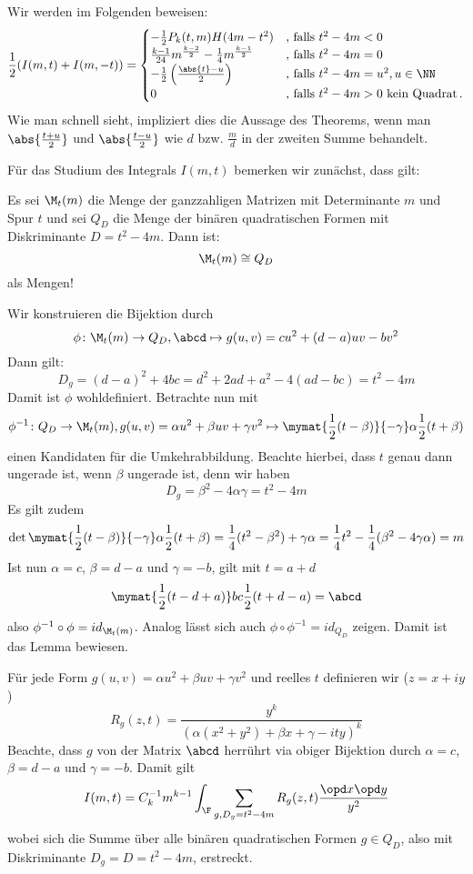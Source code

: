 \begin{bewe}
Wir werden im Folgenden beweisen:
\[
	\frac 12 (I(m,t) + I(m, -t)) = \begin{cases}
		- \frac 12 P_k(t,m) H(4m - t^2) &\text{, falls } t^2 - 4m < 0 \\
	\frac{k-1}{24} m^{\frac {k-2}2} - \frac 14 m^{\frac {k-1}2} &\text{, falls } t^2 - 4m = 0 \\
	- \frac 12 \left( \frac{\abs{t} - u}2 \right)&\text{, falls } t^2 - 4m = u^2, u \in \NN \\
	0 &\text{, falls } t^2 - 4m > 0 \text{ kein Quadrat} \,.
\end{cases}
\]
Wie man schnell sieht, impliziert dies die Aussage des Theorems, wenn man $\abs {\frac {t+u}2}$ und $\abs {\frac {t-u}2}$ wie $d$ bzw. $\frac md$ in der zweiten Summe behandelt.

Für das Studium des Integrals $I(m,t)$ bemerken wir zunächst, dass gilt:

\begin{lemm}
Es sei $\M_t(m)$ die Menge der ganzzahligen Matrizen mit Determinante $m$ und Spur $t$ und sei $Q_D$ die Menge der binären quadratischen Formen mit Diskriminante $D = t^2 - 4m$. Dann ist:
\[
	\M_t (m) \cong Q_D
\]
als Mengen!
\end{lemm}

\begin{bewe}
Wir konstruieren die Bijektion durch
\[
	\phi \colon \M_t (m) \to Q_D, \abcd \mapsto g(u, v) = cu^2 + (d-a)uv - bv^2
\]
Dann gilt:
\[
	D_g = (d-a)^2 + 4bc = d^2 + 2ad + a^2 - 4(ad-bc) = t^2 - 4m
\]
Damit ist $\phi$ wohldefiniert. Betrachte nun mit
\[
	\phi^{-1} \colon Q_D \to \M_t (m), g(u, v) = \alpha u^2 + \beta uv + \gamma v^2 \mapsto \mymat {\frac 12 (t - \beta)} {-\gamma} \alpha {\frac 12(t + \beta)}
\]
einen Kandidaten für die Umkehrabbildung. Beachte hierbei, dass $t$ genau dann ungerade ist, wenn $\beta$ ungerade ist, denn wir haben
\[
	D_g = \beta^2 - 4\alpha \gamma = t^2 - 4m
\]
Es gilt zudem
\[
	\det \mymat {\frac 12 (t - \beta)} {-\gamma} \alpha {\frac 12(t + \beta)} = \frac 14 (t^2 - \beta^2) + \gamma \alpha = \frac 14 t^2 - \frac 14 (\beta^2 - 4\gamma \alpha) = m
\]
Ist nun $\alpha = c$, $\beta = d - a$ und $\gamma = -b$, gilt mit $t = a+d$
\[
	\mymat {\frac 12(t-d+a)} bc {\frac 12(t+d-a)} = \abcd
\]
also $\phi^{-1} \circ \phi = id_{\M_t(m)}$. Analog lässt sich auch $\phi \circ \phi^{-1} = id_{Q_D}$ zeigen. Damit ist das Lemma bewiesen.
\end{bewe}

Für jede Form $g(u, v) = \alpha u^2 + \beta uv + \gamma v^2$ und reelles $t$ definieren wir ($z = x + iy$)
\[
	R_g(z,t) = \frac {y^k} {\left( \alpha(x^2 + y^2) + \beta x + \gamma - ity \right)^k}
\]
Beachte, dass $g$ von der Matrix $\abcd$ herrührt via obiger Bijektion durch $\alpha = c$, $\beta = d - a$ und $\gamma = -b$. Damit gilt
\[
	I(m, t) = C_k^{-1} m^{k-1} \int_\F \sum_{g, D_g = t^2 - 4m} R_g(z,t) \frac {\opd x \opd y}{y^2}
\]
wobei sich die Summe über alle binären quadratischen Formen $g \in Q_D$, also mit Diskriminante $D_g = D = t^2 - 4m$, erstreckt.


\end{bewe}
